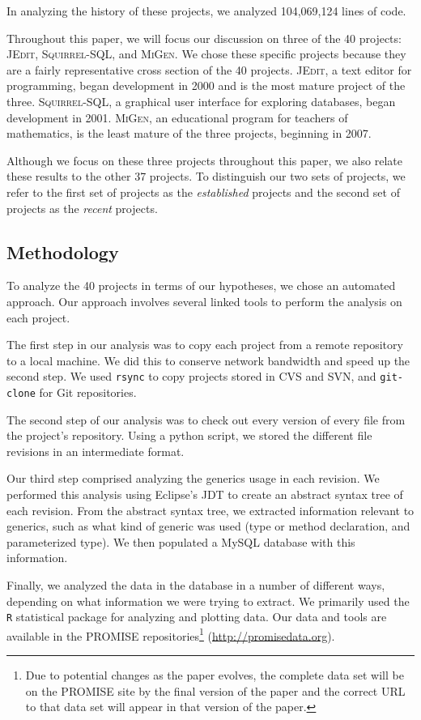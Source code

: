 \documentclass{svjour3}
\newcommand{\code}[1]{\texttt{#1}}
\newcommand{\squirrelsql}{\textsc{Squirrel-SQL}\xspace}
\newcommand{\jedit}{\textsc{JEdit}\xspace}
\newcommand{\migen}{\textsc{MiGen}\xspace}
\begin{document}
In analyzing the history of these projects, we analyzed 104,069,124 lines of code.

Throughout this paper, we will focus our discussion on three of the 40 projects: 
\jedit, \squirrelsql, and \migen.
We chose these specific projects because they are a fairly representative 
cross section of the 40 projects.
\jedit, a text editor for programming, began development in 2000 
and is the most mature project of the three.
\squirrelsql, a graphical user interface for exploring databases, began development in 
2001.
\migen, an educational program for teachers of mathematics,
is the least mature of the three projects, beginning in 2007.

Although we focus on these three projects throughout this paper, we
also relate these results to the other 37 projects.  To distinguish our two sets of projects, 
we refer to the first set of projects as the \emph{established} projects and the second set of projects as the \emph{recent} projects.

\subsection{Methodology}\label{sec:methodology}

To analyze the 40 projects in terms of our hypotheses, we chose an automated
approach. Our approach involves several linked tools to perform the analysis 
on each project.

The first step in our analysis was to copy each project from a remote
repository to a local machine.
We did this to conserve network bandwidth and speed up the second step.
We used \code{rsync} to copy projects stored in CVS and SVN, 
and \code{git-clone} for Git repositories. 

The second step of our analysis was to check out every version of every file
from the project's repository.
Using a python script, we stored the different file revisions in an
intermediate format.

Our third step comprised analyzing the generics usage in each revision.
We performed this analysis using Eclipse's JDT to create an abstract
syntax tree of each revision.
From the abstract syntax tree, we extracted information relevant to
generics, such as what kind of generic was used (type or method
declaration, and parameterized type).
We then populated a MySQL database with this information.

Finally, we analyzed the data in the database in a number of different 
ways, depending on what information we were trying to extract.
We primarily used the \texttt{R} statistical package for analyzing 
and plotting data.  Our data and tools are available in the PROMISE repositories\footnote{Due to potential
changes as the paper evolves, the complete data set
will be on the PROMISE site by the final version of the paper and the correct URL to that data set will appear
in that version of the paper.} (\url{http://promisedata.org}).
\end{document}
